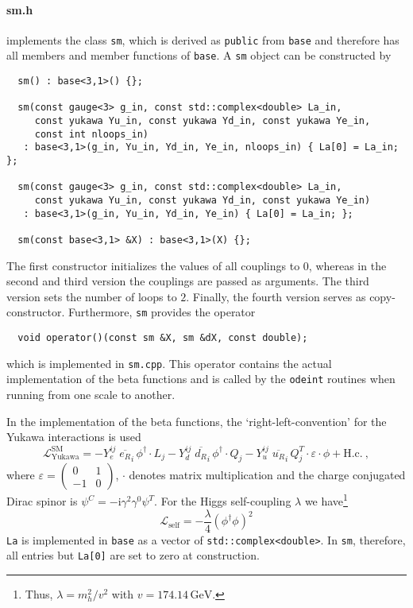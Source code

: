 \documentclass[11pt,a4paper]{article}
\begin{document}
\paragraph{sm.h}
implements the class \texttt{sm}, which is derived as \texttt{public} from \texttt{base} and therefore has all members and member functions of \texttt{base}. A \texttt{sm} object can be constructed by
\begin{lstlisting}
  sm() : base<3,1>() {};
  
  sm(const gauge<3> g_in, const std::complex<double> La_in,
     const yukawa Yu_in, const yukawa Yd_in, const yukawa Ye_in,
     const int nloops_in)
   : base<3,1>(g_in, Yu_in, Yd_in, Ye_in, nloops_in) { La[0] = La_in; };
   
  sm(const gauge<3> g_in, const std::complex<double> La_in,
     const yukawa Yu_in, const yukawa Yd_in, const yukawa Ye_in)
   : base<3,1>(g_in, Yu_in, Yd_in, Ye_in) { La[0] = La_in; };
   
  sm(const base<3,1> &X) : base<3,1>(X) {};
\end{lstlisting}
The first constructor initializes the values of all couplings to $0$, whereas in the second and third version the couplings are passed as arguments. The third version sets the number of loops to $2$.
Finally, the fourth version serves as copy-constructor.
Furthermore, \texttt{sm} provides the operator
\begin{lstlisting}
  void operator()(const sm &X, sm &dX, const double);
\end{lstlisting}
which is implemented in \texttt{sm.cpp}. This operator contains the actual implementation of the beta functions and is called by the \texttt{odeint} routines when running from one scale to another.

In the implementation of the beta functions, the `right-left-convention' for the Yukawa interactions is used
\begin{equation} \label{eq:sm_yuk}
    \mathcal{L}_{\mathrm{Yukawa}}^{\mathrm{SM}} = - Y_e^{ij}\; \overline{e_{R}}_{i} \, \phi^\dagger \cdot L_j
  - Y_d^{ij}\; \overline{d_{R}}_{i} \, \phi^\dagger \cdot Q_j
  - Y_u^{ij}\; \overline{u_{R}}_{i} \, Q_j^T \cdot \varepsilon \cdot \phi + \mathrm{H.c.}~,
\end{equation}
where $\varepsilon = \left(\begin{smallmatrix} 0 & 1 \\ -1 & 0 \end{smallmatrix}\right)$, $\cdot$ denotes matrix multiplication and the charge conjugated Dirac spinor is $\psi^C = -\mathrm{i}\gamma^2\gamma^0\psi^T$. For the Higgs self-coupling $\lambda$ we have\footnote{Thus, $\lambda = m_h^2/v^2$ with $v=174.14\,\mathrm{GeV}$.}
\begin{equation} \label{eq:sm_la}
  \mathcal{L}_{\mathrm{self}} = -\frac{\lambda}{4} (\phi^\dagger\phi)^2
\end{equation}
\texttt{La} is implemented in \texttt{base} as a vector of \texttt{std::complex<double>}. In \texttt{sm}, therefore, all entries but \texttt{La[0]} are set to zero at construction.
\end{document}
